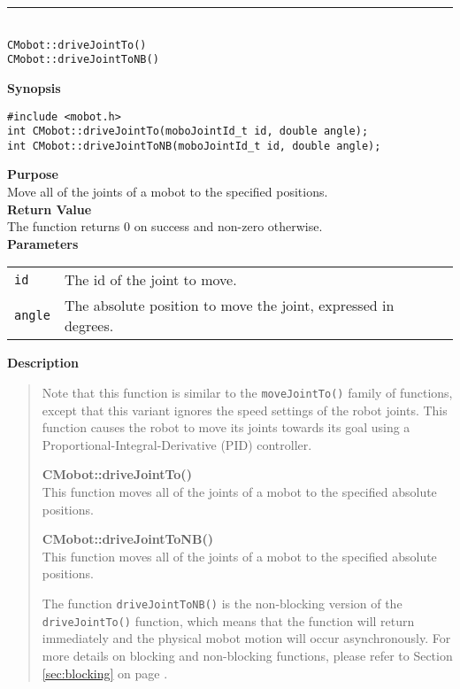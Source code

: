 \noindent
\vspace{5pt}
\rule{4.5in}{0.015in}\\
\noindent
{\LARGE \texttt{CMobot::driveJointTo()}}\\
{\LARGE \texttt{CMobot::driveJointToNB()}}\\
{}

\noindent
{\bf Synopsis}
\vspace{-8pt}
\begin{verbatim}
#include <mobot.h>
int CMobot::driveJointTo(moboJointId_t id, double angle);
int CMobot::driveJointToNB(moboJointId_t id, double angle);
\end{verbatim}

\noindent
{\bf Purpose}\\
Move all of the joints of a mobot to the specified positions.\\

\noindent
{\bf Return Value}\\
The function returns 0 on success and non-zero otherwise.\\

\noindent
{\bf Parameters}\\
\vspace{-0.1in}
\begin{description}
\item               
\begin{tabular}{p{15 mm}p{105 mm}}
\texttt{id} & The id of the joint to move. \\
\texttt{angle} & The absolute position to move the joint, expressed in degrees. \\
\end{tabular}
\end{description}
\noindent

{\bf Description}\\
\vspace{-12pt}
\begin{quote}
Note that this function is similar to the \texttt{moveJointTo()} family of functions, except
that this variant ignores the speed settings of the robot joints. This function causes
the robot to move its joints towards its goal using a Proportional-Integral-Derivative (PID)
controller.

{\bf CMobot::driveJointTo()}\\
This function moves all of the joints of a mobot to the specified absolute positions. 

{\bf CMobot::driveJointToNB()}\\
This function moves all of the joints of a mobot to the specified absolute positions. 

The function \texttt{driveJointToNB()} is the non-blocking version of
the \texttt{driveJointTo()} function, which means that the function will return
immediately and the physical mobot motion will occur asynchronously. For
more details on blocking and non-blocking functions, please refer to 
Section \ref{sec:blocking} on page \pageref{sec:blocking}.\\
\end{quote}

